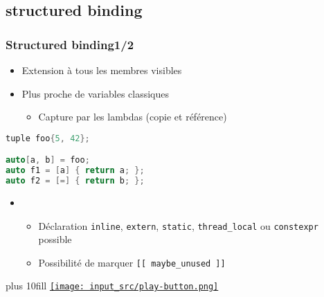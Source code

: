\documentclass[C++.tex]{subfiles}
\begin{document}
\subsection*{structured binding}
\begin{frame}[fragile]
	\frametitle{Structured binding\titlehfill{}1/2}
	\begin{itemize}
		\item Extension à tous les membres visibles

	
		\item Plus proche de variables classiques
		\begin{itemize}
			\item Capture par les lambdas (copie et référence)
		\end{itemize}
	\end{itemize}


	\begin{lstlisting}[language=C++]
tuple foo{5, 42};

auto[a, b] = foo;
auto f1 = [a] { return a; };
auto f2 = [=] { return b; };\end{lstlisting}

	\begin{itemize}
		\item [] \begin{itemize}
			\item Déclaration \lstinline|inline|, \lstinline|extern|, \lstinline|static|, \lstinline|thread_local| ou \lstinline|constexpr| possible
			\item Possibilité de marquer \lstinline|[[ maybe_unused ]]|
		\end{itemize}
	\end{itemize}

	\vskip 10mm plus 10fill
	\hfill
	\href{https://godbolt.org/#g:!((g:!((g:!((h:codeEditor,i:(filename:'1',fontScale:14,fontUsePx:'0',j:1,lang:c%2B%2B,selection:(endColumn:1,endLineNumber:15,positionColumn:1,positionLineNumber:15,selectionStartColumn:1,selectionStartLineNumber:15,startColumn:1,startLineNumber:15),source:'%23include+%3Ciostream%3E%0A%23include+%3Ctuple%3E%0A%0Aint+main()%0A%7B%0A++std::tuple+foo%7B5,+42%7D%3B%0A%0A++auto%5Ba,+b%5D+%3D+foo%3B%0A++auto+f1+%3D+%5Ba%5D+%7B+return+a%3B+%7D%3B%0A++auto+f2+%3D+%5B%3D%5D+%7B+return+b%3B+%7D%3B%0A%0A++std::cout+%3C%3C+f1()+%3C%3C+%22%5Cn%22%3B%0A++std::cout+%3C%3C+f2()+%3C%3C+%22%5Cn%22%3B%0A%7D%0A'),l:'5',n:'0',o:'C%2B%2B+source+%231',t:'0')),k:50,l:'4',n:'0',o:'',s:0,t:'0'),(g:!((h:executor,i:(argsPanelShown:'1',compilationPanelShown:'0',compiler:g112,compilerOutShown:'0',execArgs:'',execStdin:'',fontScale:14,fontUsePx:'0',j:1,lang:c%2B%2B,libs:!((name:boost,ver:'175')),options:'-std%3Dc%2B%2B20',source:1,stdinPanelShown:'1',tree:'1',wrap:'0'),l:'5',n:'0',o:'Executor+x86-64+gcc+11.2+(C%2B%2B,+Editor+%231)',t:'0')),header:(),k:50,l:'4',n:'0',o:'',s:0,t:'0')),l:'2',n:'0',o:'',t:'0')),version:4}{\texttt{[image: input\_src/play-button.png]}}
\end{frame}
\end{document}
